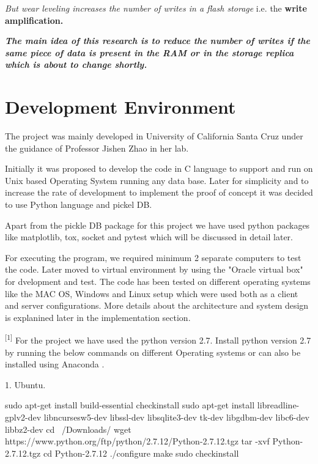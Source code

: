  \textit{But wear leveling increases the number of writes in a flash storage} i.e. the \textbf{write amplification.}
 
 \textbf{\textit{The main idea of this research is to reduce the number of writes if the same piece of data is present in the RAM or in the storage replica which is about to change shortly.}}

\section{Development Environment}

The project was mainly developed in University of California Santa Cruz under the guidance of Professor Jishen Zhao in her lab. 

Initially it was proposed to develop the code in C language to support and run on Unix based Operating System running any data base. Later for simplicity and to increase the rate of development to implement the proof of concept it was decided to use Python language and pickel DB.

 Apart from the pickle DB package for this project we have used python packages like matplotlib, tox, socket and pytest which will be discussed in detail later.

For executing the program, we required minimum 2 separate computers to test the code.  Later moved to virtual environment by using the "Oracle virtual box" for dvelopment and test. The code has been tested on different operating systems like the MAC OS, Windows and Linux setup which were used both as a client and server configurations. More details about the architecture and system design is explanined later in the implementation section. 


\textsuperscript{[1]} For the project we have used the python version 2.7. Install python version 2.7 by running the below commands on different Operating systems or can also be installed using Anaconda .


1. Ubuntu.

sudo apt-get install build-essential checkinstall
sudo apt-get install libreadline-gplv2-dev libncursesw5-dev libssl-dev libsqlite3-dev tk-dev libgdbm-dev libc6-dev libbz2-dev
cd ~/Downloads/
wget https://www.python.org/ftp/python/2.7.12/Python-2.7.12.tgz
tar -xvf Python-2.7.12.tgz
cd Python-2.7.12
./configure
make
sudo checkinstall

